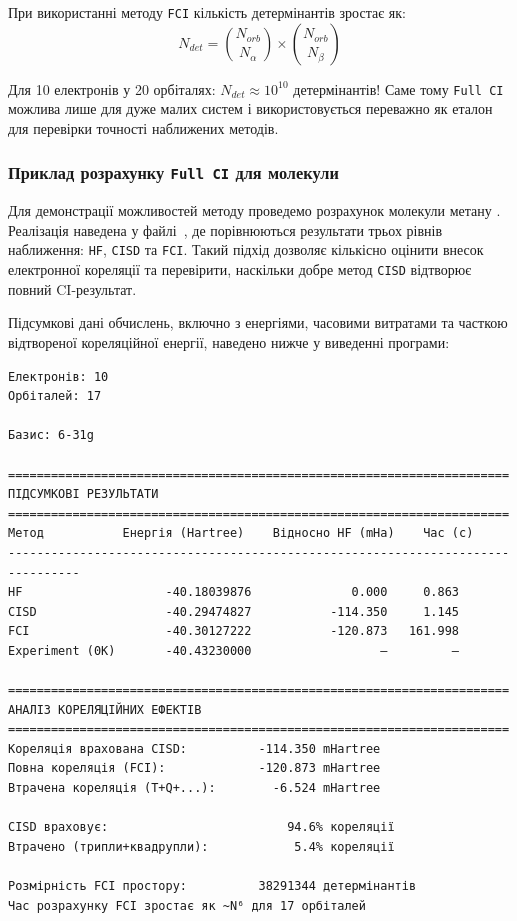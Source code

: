 При використанні методу \texttt{FCI} кількість детермінантів зростає як:
\begin{equation}
    N_{det} = \binom{N_{orb}}{N_{\alpha}} \times \binom{N_{orb}}{N_{\beta}}
\end{equation}

Для 10 електронів у 20 орбіталях: $N_{det} \approx 10^{10}$ детермінантів!
Саме тому \texttt{Full CI} можлива лише для дуже малих систем і використовується переважно як еталон для перевірки точності наближених методів.

\subsubsection{Приклад розрахунку \texttt{Full CI} для молекули }


Для демонстрації можливостей методу проведемо розрахунок молекули метану .
Реалізація наведена у файлі~,
де порівнюються результати трьох рівнів наближення:
\texttt{HF}, \texttt{CISD} та \texttt{FCI}.
Такий підхід дозволяє кількісно оцінити внесок електронної кореляції
та перевірити, наскільки добре метод \texttt{CISD} відтворює повний CI-результат.

Підсумкові дані обчислень, включно з енергіями, часовими витратами та часткою відтвореної кореляційної енергії, наведено нижче у виведенні програми:
\begin{verbatim}
Електронів: 10
Орбіталей: 17

Базис: 6-31g

======================================================================
ПІДСУМКОВІ РЕЗУЛЬТАТИ
======================================================================
Метод           Енергія (Hartree)    Відносно HF (mHa)    Час (с)
--------------------------------------------------------------------------------
HF                    -40.18039876              0.000     0.863
CISD                  -40.29474827           -114.350     1.145
FCI                   -40.30127222           -120.873   161.998
Experiment (0K)       -40.43230000                  —         —

======================================================================
АНАЛІЗ КОРЕЛЯЦІЙНИХ ЕФЕКТІВ
======================================================================
Кореляція врахована CISD:          -114.350 mHartree
Повна кореляція (FCI):             -120.873 mHartree
Втрачена кореляція (T+Q+...):        -6.524 mHartree

CISD враховує:                         94.6% кореляції
Втрачено (трипли+квадрупли):            5.4% кореляції

Розмірність FCI простору:          38291344 детермінантів
Час розрахунку FCI зростає як ~N⁶ для 17 орбіталей
\end{verbatim}

